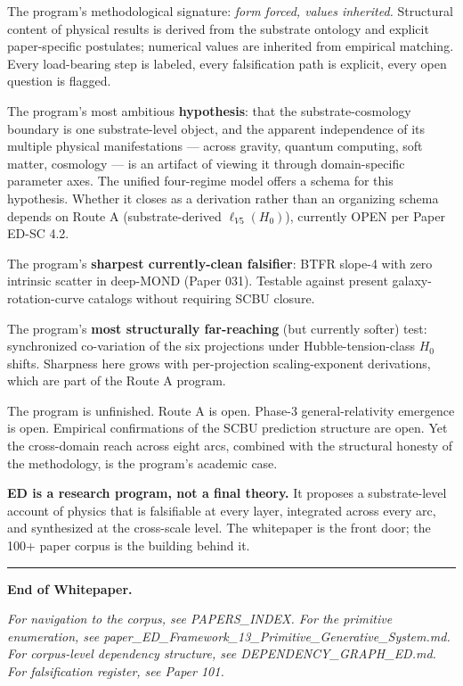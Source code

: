 \documentclass[11pt,a4paper]{article}
\begin{document}
The program's methodological signature: \emph{form forced, values inherited.} Structural content of physical results is derived from the substrate ontology and explicit paper-specific postulates; numerical values are inherited from empirical matching. Every load-bearing step is labeled, every falsification path is explicit, every open question is flagged.

The program's most ambitious \textbf{hypothesis}: that the substrate-cosmology boundary is one substrate-level object, and the apparent independence of its multiple physical manifestations --- across gravity, quantum computing, soft matter, cosmology --- is an artifact of viewing it through domain-specific parameter axes. The unified four-regime model offers a schema for this hypothesis. Whether it closes as a derivation rather than an organizing schema depends on Route A (substrate-derived $\ell_{V5}(H_0)$), currently OPEN per Paper ED-SC 4.2.

The program's \textbf{sharpest currently-clean falsifier}: BTFR slope-4 with zero intrinsic scatter in deep-MOND (Paper 031). Testable against present galaxy-rotation-curve catalogs without requiring SCBU closure.

The program's \textbf{most structurally far-reaching} (but currently softer) test: synchronized co-variation of the six projections under Hubble-tension-class $H_0$ shifts. Sharpness here grows with per-projection scaling-exponent derivations, which are part of the Route A program.

The program is unfinished. Route A is open. Phase-3 general-relativity emergence is open. Empirical confirmations of the SCBU prediction structure are open. Yet the cross-domain reach across eight arcs, combined with the structural honesty of the methodology, is the program's academic case.

\textbf{ED is a research program, not a final theory.} It proposes a substrate-level account of physics that is falsifiable at every layer, integrated across every arc, and synthesized at the cross-scale level. The whitepaper is the front door; the 100+ paper corpus is the building behind it.

\vspace{1em}
\hrule
\vspace{1em}

\textbf{End of Whitepaper.}

\textit{For navigation to the corpus, see PAPERS\_INDEX. For the primitive enumeration, see paper\_ED\_Framework\_13\_Primitive\_Generative\_System.md. For corpus-level dependency structure, see DEPENDENCY\_GRAPH\_ED.md. For falsification register, see Paper 101.}
\end{document}
